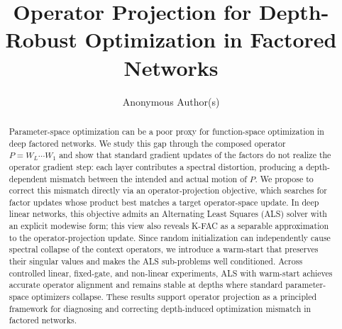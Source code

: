 \documentclass{article}
\title{Operator Projection for Depth-Robust Optimization in Factored Networks}
\author{Anonymous Author(s)}
\begin{document}
\maketitle

\begin{abstract}
Parameter-space optimization can be a poor proxy for function-space optimization in deep factored networks. We study this gap through the composed operator $P = W_L \cdots W_1$ and show that standard gradient updates of the factors do not realize the operator gradient step: each layer contributes a spectral distortion, producing a depth-dependent mismatch between the intended and actual motion of $P$. We propose to correct this mismatch directly via an operator-projection objective, which searches for factor updates whose product best matches a target operator-space update. In deep linear networks, this objective admits an Alternating Least Squares (ALS) solver with an explicit modewise form; this view also reveals K-FAC as a separable approximation to the operator-projection update. Since random initialization can independently cause spectral collapse of the context operators, we introduce a warm-start that preserves their singular values and makes the ALS sub-problems well conditioned. Across controlled linear, fixed-gate, and non-linear experiments, ALS with warm-start achieves accurate operator alignment and remains stable at depths where standard parameter-space optimizers collapse. These results support operator projection as a principled framework for diagnosing and correcting depth-induced optimization mismatch in factored networks.
\end{abstract}

\end{document}
